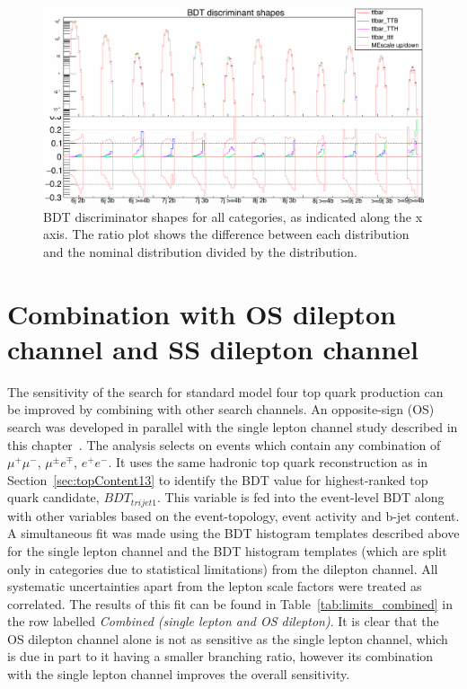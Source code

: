 \begin{figure}[ht]
\centering
    \includegraphics[width=\textwidth]{images/Run2/ttbarShapesLabels.png}
    \caption{BDT discriminator shapes for all categories, as indicated along the x axis. The ratio plot shows the difference between each distribution and the nominal \ttbar distribution divided by the \ttbar distribution.}
    \label{fig:TTB}
\end{figure}


\section{Combination with OS dilepton channel and SS dilepton channel ~\label{sec:combo13}}

The sensitivity of the search for standard model four top quark production can be improved by combining with other search channels. An opposite-sign (OS) search was developed in parallel with the single lepton channel study described in this chapter~\cite{CMS-PAS-TOP-16-016}. The analysis selects on events which contain any combination of $\mu^{+}\mu^{-}$, $\mu^{\pm} e^{\mp}$, $e^{+}e^{-}$. It uses the same hadronic top quark reconstruction as in Section~\ref{sec:topContent13} to identify the BDT value for highest-ranked top quark candidate, $BDT_{trijet1}$. This variable is fed into the event-level BDT along with other variables based on the event-topology, event activity and b-jet content. A simultaneous fit was made using the BDT histogram templates described above for the single lepton channel and the BDT histogram templates (which are split only in \njets categories due to statistical limitations) from the dilepton channel. All systematic uncertainties apart from the lepton scale factors were treated as correlated. The results of this fit can be found in Table~\ref{tab:limits_combined} in the row labelled \emph{Combined (single lepton and OS dilepton)}. It is clear that the OS dilepton channel alone is not as sensitive as the single lepton channel, which is due in part to it having a smaller branching ratio, however its combination with the single lepton channel improves the overall sensitivity.\\

